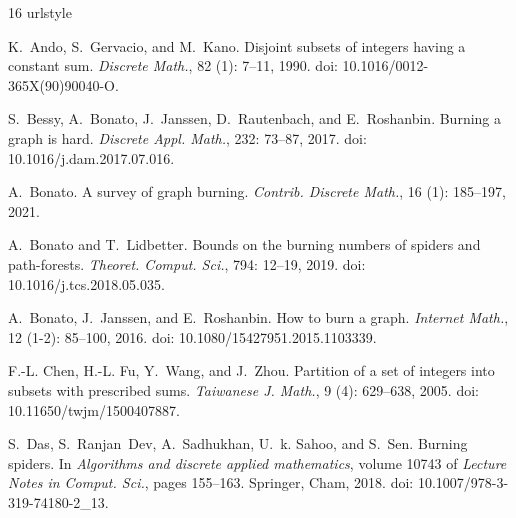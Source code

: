 \documentclass[
final
]{dmtcs-episciences}
\theoremstyle{definition}
\theoremstyle{remark}
\begin{document}
\begin{thebibliography}{16}
	\providecommand{\natexlab}[1]{#1}
	\providecommand{\url}[1]{\texttt{#1}}
	\expandafter\ifx\csname urlstyle\endcsname\relax
	\providecommand{\doi}[1]{doi: #1}\else
	\providecommand{\doi}{doi: \begingroup \urlstyle{rm}\Url}\fi
	
	K.~Ando, S.~Gervacio, and M.~Kano.
	\newblock Disjoint subsets of integers having a constant sum.
	\newblock \emph{Discrete Math.}, 82 (1): 7--11, 1990.
		\newblock \doi{10.1016/0012-365X(90)90040-O}.
	
	
	S.~Bessy, A.~Bonato, J.~Janssen, D.~Rautenbach, and E.~Roshanbin.
	\newblock Burning a graph is hard.
	\newblock \emph{Discrete Appl. Math.}, 232: 73--87, 2017.
	\newblock \doi{10.1016/j.dam.2017.07.016}.

	A.~Bonato.
	\newblock A survey of graph burning.
	\newblock \emph{Contrib. Discrete Math.}, 16 (1): 185--197,
	2021.
	
	A.~Bonato and T.~Lidbetter.
	\newblock Bounds on the burning numbers of spiders and path-forests.
	\newblock \emph{Theoret. Comput. Sci.}, 794: 12--19, 2019.
	\newblock \doi{10.1016/j.tcs.2018.05.035}.
	
	A.~Bonato, J.~Janssen, and E.~Roshanbin.
	\newblock How to burn a graph.
	\newblock \emph{Internet Math.}, 12 (1-2): 85--100, 2016.
\newblock \doi{10.1080/15427951.2015.1103339}.

	
	F.-L. Chen, H.-L. Fu, Y.~Wang, and J.~Zhou.
	\newblock Partition of a set of integers into subsets with prescribed sums.
	\newblock \emph{Taiwanese J. Math.}, 9 (4): 629--638, 2005.
	\newblock \doi{10.11650/twjm/1500407887}.

	
	S.~Das, S.~Ranjan~Dev, A.~Sadhukhan, U.~k. Sahoo, and S.~Sen.
	\newblock Burning spiders.
	\newblock In \emph{Algorithms and discrete applied mathematics}, volume 10743
	of \emph{Lecture Notes in Comput. Sci.}, pages 155--163. Springer, Cham,
	2018.
	\newblock \doi{10.1007/978-3-319-74180-2\_13}.
	

\end{thebibliography}
\end{document}
